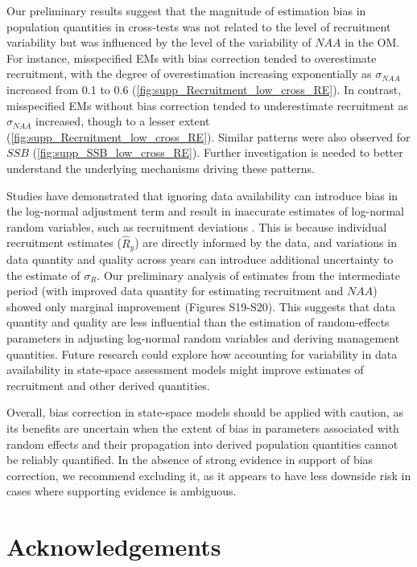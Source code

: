 \documentclass[
  12pt,
]{article}
\begin{document}
Our preliminary results suggest that the magnitude of estimation bias in
population quantities in cross-tests was not related to the level of
recruitment variability but was influenced by the level of the
variability of \(NAA\) in the OM. For instance, misspecified EMs with
bias correction tended to overestimate recruitment, with the degree of
overestimation increasing exponentially as \(\sigma_{NAA}\) increased
from 0.1 to 0.6 (\autoref{fig:supp_Recruitment_low_cross_RE}). In
contrast, misspecified EMs without bias correction tended to
underestimate recruitment as \(\sigma_{NAA}\) increased, though to a
lesser extent (\autoref{fig:supp_Recruitment_low_cross_RE}). Similar
patterns were also observed for \(SSB\)
(\autoref{fig:supp_SSB_low_cross_RE}). Further investigation is needed
to better understand the underlying mechanisms driving these patterns.

Studies have demonstrated that ignoring data availability can introduce
bias in the log-normal adjustment term and result in inaccurate
estimates of log-normal random variables, such as recruitment deviations
\citep{Methot2011, Thorson2016}. This is because individual recruitment
estimates (\(\hat{R}_{y}\)) are directly informed by the data, and
variations in data quantity and quality across years can introduce
additional uncertainty to the estimate of \(\sigma_{R}\). Our
preliminary analysis of estimates from the intermediate period (with
improved data quantity for estimating recruitment and \(NAA\)) showed
only marginal improvement (Figures S19-S20). This suggests that data
quantity and quality are less influential than the estimation of
random-effects parameters in adjusting log-normal random variables and
deriving management quantities. Future research could explore how
accounting for variability in data availability in state-space
assessment models might improve estimates of recruitment and other
derived quantities.

Overall, bias correction in state-space models should be applied with
caution, as its benefits are uncertain when the extent of bias in
parameters associated with random effects and their propagation into
derived population quantities cannot be reliably quantified. In the
absence of strong evidence in support of bias correction, we recommend
excluding it, as it appears to have less downside risk in cases where
supporting evidence is ambiguous.

\hypertarget{acknowledgements}{%
\section{Acknowledgements}\label{acknowledgements}}
\end{document}
